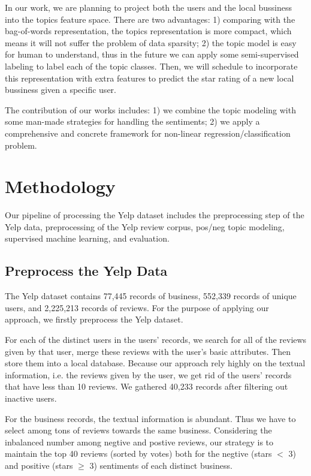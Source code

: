 \documentclass[10pt,twocolumn,letterpaper]{article}
\begin{document}
In our work, we are planning to project both the users and the local bussiness into the topics feature space. There are two advantages: 1) comparing with the bag-of-words representation, the topics representation is more compact, which means it will not suffer the problem of data sparsity; 2) the topic model is easy for human to understand, thus in the future we can apply some semi-supervised labeling to label each of the topic classes. Then, we will schedule to incorporate this representation with extra features to predict the star rating of a new local bussiness given a specific user.

The contribution of our works includes: 1) we combine the topic modeling with some man-made strategies for handling the sentiments; 2) we apply a comprehensive and concrete framework for non-linear regression/classification problem.

\section{Methodology}

Our pipeline of processing the Yelp dataset includes the preprocessing step of the Yelp data, preprocessing of the Yelp review corpus, pos/neg topic modeling, supervised machine learning, and evaluation.

\subsection{Preprocess the Yelp Data}

The Yelp dataset contains 77,445 records of business, 552,339 records of unique users, and 2,225,213 records of reviews. For the purpose of applying our approach, we firstly preprocess the Yelp dataset.

For each of the distinct users in the users' records, we search for all of the reviews given by that user, merge these reviews with the user's basic attributes. Then store them into a local database. Because our approach rely highly on the textual information, i.e. the reviews given by the user, we get rid of the users' records that have less than 10 reviews. We gathered 40,233 records after filtering out inactive users.

For the business records, the textual information is abundant. Thus we have to select among tons of reviews towards the same business. Considering the inbalanced number among negtive and postive reviews, our strategy is to maintain the top 40 reviews (sorted by votes) both for the negtive (stars $<$ 3) and positive (stars $\ge$ 3) sentiments of each distinct business.
\end{document}
